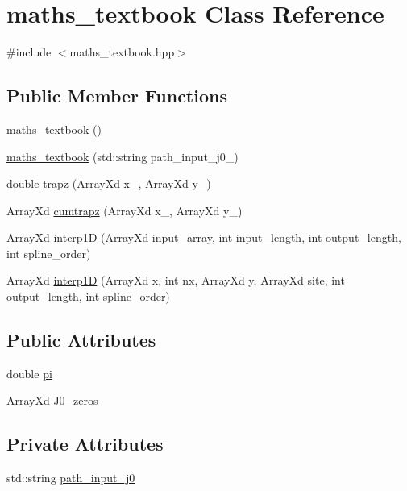 \hypertarget{classmaths__textbook}{}\section{maths\+\_\+textbook Class Reference}
\label{classmaths__textbook}


{\ttfamily \#include $<$maths\+\_\+textbook.\+hpp$>$}

\subsection*{Public Member Functions}
\begin{DoxyCompactItemize}
\item 
\hyperlink{classmaths__textbook_a7be915ec6de7f305b96325ff5d821607}{maths\+\_\+textbook} ()
\item 
\hyperlink{classmaths__textbook_acca32bf0f3860cbb8e76687435f0fa24}{maths\+\_\+textbook} (std\+::string path\+\_\+input\+\_\+j0\+\_\+)
\item 
double \hyperlink{classmaths__textbook_a158ce9c89ee1db5495810c25ee2aed57}{trapz} (Array\+Xd x\+\_\+, Array\+Xd y\+\_\+)
\item 
Array\+Xd \hyperlink{classmaths__textbook_ae893700d202ab9a84e33974f9ca42da3}{cumtrapz} (Array\+Xd x\+\_\+, Array\+Xd y\+\_\+)
\item 
Array\+Xd \hyperlink{classmaths__textbook_a803caea252953788b96a898a3bab9bd0}{interp1D} (Array\+Xd input\+\_\+array, int input\+\_\+length, int output\+\_\+length, int spline\+\_\+order)
\item 
Array\+Xd \hyperlink{classmaths__textbook_ac4789e1e67a597303faab6cc5fa889ec}{interp1D} (Array\+Xd x, int nx, Array\+Xd y, Array\+Xd site, int output\+\_\+length, int spline\+\_\+order)
\end{DoxyCompactItemize}
\subsection*{Public Attributes}
\begin{DoxyCompactItemize}
\item 
double \hyperlink{classmaths__textbook_a96b811ef2a81ca51b98cf2a10c8ac5bc}{pi}
\item 
Array\+Xd \hyperlink{classmaths__textbook_a41398eada5e3eb88fb64d044c14aed26}{J0\+\_\+zeros}
\end{DoxyCompactItemize}
\subsection*{Private Attributes}
\begin{DoxyCompactItemize}
\item 
std\+::string \hyperlink{classmaths__textbook_a5c8a254bd117beaba43916c38f8f6a66}{path\+\_\+input\+\_\+j0}
\end{DoxyCompactItemize}


